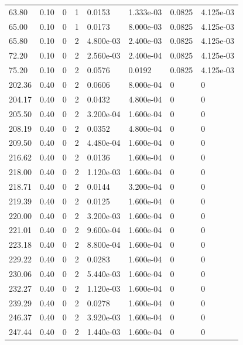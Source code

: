 \documentclass[preview]{standalone}
\begin{document}
{{\begin{tabular}{L{1.2cm}C{1.2cm} C{0.3cm}C{0.5cm} C{1.4cm}C{1.4cm} C{1.4cm}C{1.4cm}}
  63.80  &  0.10  & 0     &  1 &  0.0153  & 1.333e-03  & 0.0825 &  4.125e-03   \\ 
  65.00  &  0.10  & 0     &  1 &  0.0173  & 8.000e-03  & 0.0825 &  4.125e-03   \\ 
  65.80  &  0.10  & 0     &  2 &  4.800e-03  & 2.400e-03  & 0.0825 &  4.125e-03   \\ 
  72.20  &  0.10  & 0     &  2 &  2.560e-03  & 2.400e-04  & 0.0825 &  4.125e-03   \\ 
  75.20  &  0.10  & 0     &  2 &  0.0576  & 0.0192  & 0.0825 &  4.125e-03   \\ 
  202.36  &  0.40  & 0     &  2 &  0.0606  & 8.000e-04  & 0 &  0   \\ 
  204.17  &  0.40  & 0     &  2 &  0.0432  & 4.800e-04  & 0 &  0   \\ 
  205.50  &  0.40  & 0     &  2 &  3.200e-04  & 1.600e-04  & 0 &  0   \\ 
  208.19  &  0.40  & 0     &  2 &  0.0352  & 4.800e-04  & 0 &  0   \\ 
  209.50  &  0.40  & 0     &  2 &  4.480e-04  & 1.600e-04  & 0 &  0   \\ 
  216.62  &  0.40  & 0     &  2 &  0.0136  & 1.600e-04  & 0 &  0   \\ 
  218.00  &  0.40  & 0     &  2 &  1.120e-03  & 1.600e-04  & 0 &  0   \\ 
  218.71  &  0.40  & 0     &  2 &  0.0144  & 3.200e-04  & 0 &  0   \\ 
  219.39  &  0.40  & 0     &  2 &  0.0125  & 1.600e-04  & 0 &  0   \\ 
  220.00  &  0.40  & 0     &  2 &  3.200e-03  & 1.600e-04  & 0 &  0   \\ 
  221.01  &  0.40  & 0     &  2 &  9.600e-04  & 1.600e-04  & 0 &  0   \\ 
  223.18  &  0.40  & 0     &  2 &  8.800e-04  & 1.600e-04  & 0 &  0   \\ 
  229.22  &  0.40  & 0     &  2 &  0.0283  & 1.600e-04  & 0 &  0   \\ 
  230.06  &  0.40  & 0     &  2 &  5.440e-03  & 1.600e-04  & 0 &  0   \\ 
  232.27  &  0.40  & 0     &  2 &  1.120e-03  & 1.600e-04  & 0 &  0   \\ 
  239.29  &  0.40  & 0     &  2 &  0.0278  & 1.600e-04  & 0 &  0   \\ 
  246.37  &  0.40  & 0     &  2 &  3.920e-03  & 1.600e-04  & 0 &  0   \\ 
  247.44  &  0.40  & 0     &  2 &  1.440e-03  & 1.600e-04  & 0 &  0   \\ 

\end{tabular}}}
\end{document}
